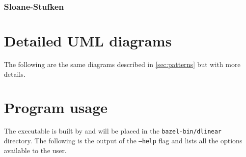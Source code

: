 \begin{appendices}
    \subsection*{Sloane-Stufken}


    \chapter{Detailed UML diagrams}

    The following are the same diagrams described in \autoref{sec:patterns} but with more details.



    \chapter{Program usage}

    The \dlinear executable is built by \bazel and will be placed in the \texttt{bazel-bin/dlinear} directory.
    The following is the output of the \texttt{--help} flag and lists all the options available to the user.

    

\end{appendices}

